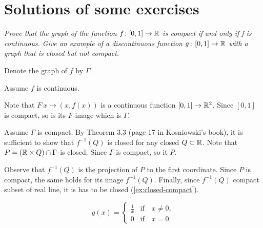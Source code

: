\chapter{Solutions of some exercises}

\textit{Prove that the graph of the function $f\colon [0,1] \to \mathbb{R}$ is compact if and
only if f is continuous.
Give an example of a discontinuous function
$g: [0,1] \to \mathbb{R}$ with a graph that is closed but not compact.}

Denote the graph of $f$ by $\Gamma$.

Assume $f$ is continuous.

Note that $F\:x\mapsto (x,f(x))$ is a continuous function $[0,1]\to\mathbb{R}^2$.
Since $[0,1]$ is compact, so is its $F$-image which is $\Gamma$.


Assume $\Gamma$ is compact.
By Theorem 3.3 (page 17 in Kosniowski's book), it is sufficient to show that $f^{-1}(Q)$ is closed for any closed $Q\subset \mathbb{R}$.
Note that $P=(\mathbb{R}\times Q)\cap\Gamma$ is closed.
Since $\Gamma$ is compact, so it $P$.

Observe that $f^{-1}(Q)$ is the projection of $P$ to the first coordinate.
Since $P$ is compact, the same holds for its image $f^{-1}(Q)$.
Finally, since $f^{-1}(Q)$ compact subset of real line, it is has to be closed (\ref{ex:closed-compact}).

\[g(x)=
\begin{cases}
\tfrac1x&\text{if}\quad x\ne0,
\\
0&\text{if}\quad x=0.
\end{cases}
\]
